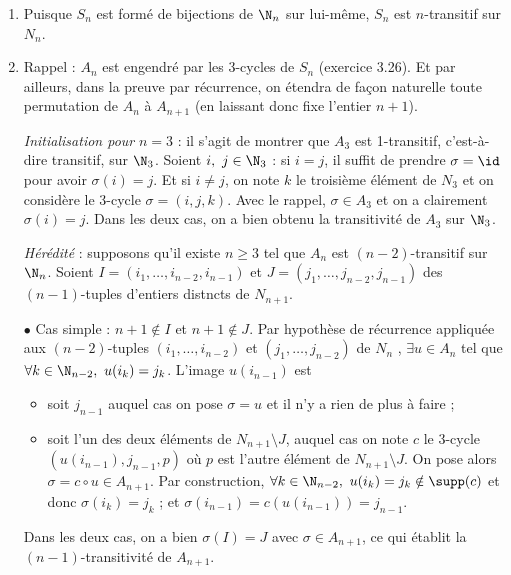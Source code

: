 
\begin{enumerate}
  \item Puisque $S_n$ est formé de bijections de $\N_n$ sur lui-même, $S_n$ est $n$-transitif sur $N_n$.
  \item Rappel : $A_n$ est engendré par les 3-cycles de $S_n$ (exercice 3.26). Et par ailleurs, dans la preuve par récurrence, on étendra de façon naturelle toute permutation de $A_n$ à $A_{n+1}$ (en laissant donc fixe l'entier $n+1$).

  \emph{Initialisation pour }$n=3$ : il s'agit de montrer que $A_3$ est 1-transitif, c'est-à-dire transitif, sur $\N_3$. Soient $i,~j\in \N_3$ : si $i=j$, il suffit de prendre $\sigma = \id$ pour avoir $\sigma(i) = j$. Et si $i\neq j$, on note $k$ le troisième élément de $N_3$ et on considère le 3-cycle $\sigma = (i,j,k)$. Avec le rappel, $\sigma \in A_3$ et on a clairement $\sigma(i) = j$. Dans les deux cas, on a bien obtenu la transitivité de $A_3$ sur $\N_3$.\medskip

  \emph{Hérédité} : supposons qu'il existe $n\geq 3$ tel que $A_n$ est $(n-2)$-transitif sur $\N_n$. Soient $I = (i_1, \ldots, i_{n-2}, i_{n-1})$ et $J = (j_1, \ldots, j_{n-2}, j_{n-1})$ des $(n-1)$-tuples d'entiers distncts de $N_{n+1}$.

  $\bullet$ Cas simple : $n+1\notin I$ et $n+1\notin J$. Par hypothèse de récurrence appliquée aux $(n-2)$-tuples $ (i_1, \ldots, i_{n-2})$ et $(j_1, \ldots, j_{n-2})$ de $N_n$ , $\exists u \in A_n$ tel que $ \forall k\in \N_{n-2},~ u(i_k) = j_k$. L'image $u(i_{n-1})$ est
  \begin{itemize}
   \item soit $j_{n-1}$ auquel cas on pose $\sigma = u$ et il n'y a rien de plus à faire ;
   \item soit l'un des deux éléments de $N_{n+1}\setminus J$, auquel cas on note $c$ le 3-cycle  $(u(i_{n-1}), j_{n-1}, p)$ où $p$ est l'autre élément de $N_{n+1}\setminus J$. On pose alors $\sigma = c \circ u \in A_{n+1}$. Par construction, $\forall k\in \N_{n-2},~ u(i_k) = j_k \notin \supp(c)$ et donc $\sigma(i_k) = j_k$ ; et $\sigma(i_{n-1}) = c(u(i_{n-1})) = j_{n-1}$.
  \end{itemize}
  Dans les deux cas, on a bien $\sigma(I) = J$ avec $\sigma\in A_{n+1}$, ce qui établit la $(n-1)$-transitivité de $A_{n+1}$.


\end{enumerate}
